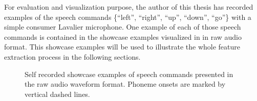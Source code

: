 For evaluation and visualization purpose, the author of this thesis has recorded examples of the speech commands \{\enquote{left}, \enquote{right}, \enquote{up}, \enquote{down}, \enquote{go}\} with a simple consumer Lavalier microphone.
One example of each of those speech commands is contained in the showcase examples visualized in  in raw audio format.
This showcase examples will be used to illustrate the whole feature extraction process in the following sections.
\begin{figure}[!ht]
  \centering
    \quad
    \quad
  \caption{Self recorded showcase examples of speech commands presented in the raw audio waveform format. Phoneme onsets are marked by vertical dashed lines.}
  \label{fig:signal_raw_showcase}
\end{figure}
